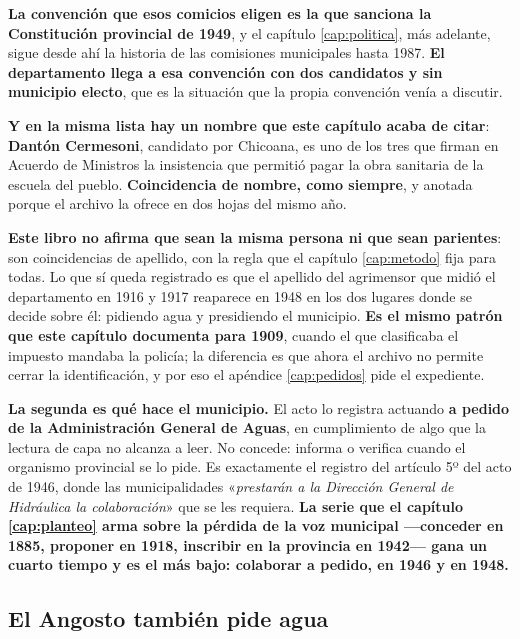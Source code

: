 \begin{cautela}
\begin{cautela}
\textbf{La convención que esos comicios eligen es la que sanciona la Constitución provincial
de 1949}, y el capítulo \ref{cap:politica}, más adelante, sigue desde ahí la historia de las comisiones
municipales hasta 1987. \textbf{El departamento llega a esa convención con dos candidatos y
sin municipio electo}, que es la situación que la propia convención venía a discutir.

\textbf{Y en la misma lista hay un nombre que este capítulo acaba de citar}: \textbf{Dantón
Cermesoni}, candidato por Chicoana, es uno de los tres que firman en Acuerdo de Ministros la
insistencia que permitió pagar la obra sanitaria de la escuela del pueblo. \textbf{Coincidencia
de nombre, como siempre}, y anotada porque el archivo la ofrece en dos hojas del mismo año.
\end{cautela}

\textbf{Este libro no afirma que sean la misma persona ni que sean parientes}: son
coincidencias de apellido, con la regla que el capítulo \ref{cap:metodo} fija para todas.
Lo que sí queda registrado es que el apellido del agrimensor que midió el departamento en
1916 y 1917 reaparece en 1948 en los dos lugares donde se decide sobre él: pidiendo agua y
presidiendo el municipio. \textbf{Es el mismo patrón que este capítulo documenta para 1909},
cuando el que clasificaba el impuesto mandaba la policía; la diferencia es que ahora el
archivo no permite cerrar la identificación, y por eso el apéndice \ref{cap:pedidos} pide el
expediente.

\textbf{La segunda es qué hace el municipio.} El acto lo registra actuando \textbf{a pedido de
la Administración General de Aguas}, en cumplimiento de algo que la lectura de capa no
alcanza a leer. No concede: informa o verifica cuando el organismo provincial se lo pide. Es
exactamente el registro del artículo 5º del acto de 1946, donde las municipalidades
«\textit{prestarán a la Dirección General de Hidráulica la colaboración}» que se les
requiera. \textbf{La serie que el capítulo \ref{cap:planteo} arma sobre la pérdida de la voz
municipal ---conceder en 1885, proponer en 1918, inscribir en la provincia en 1942--- gana
un cuarto tiempo y es el más bajo: colaborar a pedido, en 1946 y en 1948.}
\end{cautela}

\subsection*{El Angosto también pide agua}

